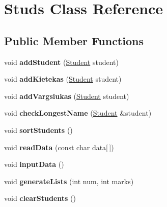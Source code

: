 \hypertarget{class_studs}{}\section{Studs Class Reference}
\label{class_studs}
\subsection*{Public Member Functions}
\begin{DoxyCompactItemize}
\item 
\mbox{\label{class_studs_a80a822ed7505fd1ff0823d6c72a2d069}} 
void {\bfseries add\+Student} (\mbox{\hyperlink{class_student}{Student}} student)
\item 
\mbox{\label{class_studs_ab8d6686a85f151b1a569a0859c934888}} 
void {\bfseries add\+Kietekas} (\mbox{\hyperlink{class_student}{Student}} student)
\item 
\mbox{\label{class_studs_a96d29102d8f38802d28616c59bc500f1}} 
void {\bfseries add\+Vargsiukas} (\mbox{\hyperlink{class_student}{Student}} student)
\item 
\mbox{\label{class_studs_a577d1a0870b76d3d5a7aee98131a17ba}} 
void {\bfseries check\+Longest\+Name} (\mbox{\hyperlink{class_student}{Student}} \&student)
\item 
\mbox{\label{class_studs_aefdad106efdc0edd3533d4ab5915bfff}} 
void {\bfseries sort\+Students} ()
\item 
\mbox{\label{class_studs_a3aabfd8a6a367f39dfc8b9c8ae4bcd7a}} 
void {\bfseries read\+Data} (const char data\mbox{[}$\,$\mbox{]})
\item 
\mbox{\label{class_studs_a2a4839701a66f74040abd0d751cfd7ae}} 
void {\bfseries input\+Data} ()
\item 
\mbox{\label{class_studs_ad9c2894964498776c712db5b1987e941}} 
void {\bfseries generate\+Lists} (int num, int marks)
\item 
\mbox{\label{class_studs_a997b1a1367644cabe41b7e64b01d5e5e}} 
void {\bfseries clear\+Students} ()

\end{DoxyCompactItemize}
